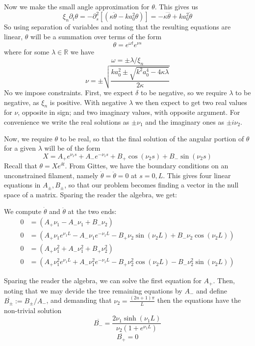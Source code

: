 \documentclass{article}
\theoremstyle{exampstyle} \newtheorem*{remark}{Remark}
\newcommand{\1}{\mathds{1}}
\begin{document}
Now we make the small angle approximation for $\theta$. This gives us
$$\xi_n \partial_t \theta = -\partial_s^2 [(\kappa\ddot{\theta} -ka_0^2\theta)] =-\kappa\ddddot{\theta} +ka_0^2\ddot{\theta}$$
So using separation of variables and noting that the resulting equations are linear, $\theta$ will be a summation over terms of the form 
$$ \theta=e^{\omega t} e^{\nu s} $$
where for some $\lambda \in \mathbb{R}$ we have
$$ \omega=\pm \lambda/\xi_n $$
$$ \nu=\pm \sqrt{ \frac{ ka_0^2 \pm \sqrt{k^2a_0^4-4\kappa\lambda} }{2\kappa} } $$
No we impose constraints. First, we expect $\delta$ to be negative, so we require $\lambda$ to be negative, as $\xi_n$ is positive. With negative $\lambda$ we then expect to get two real values for $\nu$, opposite in sign; and two imaginary values, with opposite argument. For convenience we write the real solutions as $\pm \nu_1$ and the imaginary ones as $\pm i \nu_2 $.

Now, we require $\theta$ to be real, so that the final solution of the angular portion of $\theta$ for a given $\lambda$ will be of the form
$$X=A_+e^{\nu_1 s}+A_-e^{-\nu_1 s}+B_+ \cos(\nu_2 s) +B_-\sin(\nu_2 s) $$
Recall that $\theta = X e^{\delta t}$. From Gittes, we have the boundary conditions on an unconstrained filament, namely $\dot{\theta}=\ddot{\theta}=0$ at $s=0,L$.
This gives four linear equations in $A_{\pm},B_{\pm}$, so that our problem becomes finding a vector in the null space of a matrix. Sparing the reader the algebra, we get:

We compute $\dot\theta$ and $\ddot\theta$ at the two ends:
\begin{align*}
0 &= \left( A_+\nu_1-A_-\nu_1+ B_-\nu_2\right)\\
0 &= \left( A_+\nu_1e^{\nu_1L} -A_-\nu_1e^{-\nu_1L} - B_+\nu_2\sin(\nu_2L) + B_-\nu_2\cos(\nu_2L)\right)\\
0 &= \left( A_+\nu_1^2 + A_-\nu_1^2 + B_+\nu_2^2\right)\\
0 &= \left( A_+\nu_1^2e^{\nu_1L} + A_-\nu_1^2e^{-\nu_1L} - B_+\nu_2^2\cos(\nu_2L) - B_-\nu_2^2\sin(\nu_2L)\right)
\end{align*}


Sparing the reader the algebra, we can solve the first equation for $A_+$. Then, noting that we may devide the tree remaining equations by $A_-$ and define $\overline{B_\pm}:=B_\pm/A_-$, and demanding that $\nu_2=\frac{(2n+1)\pi}{L}$ then the equations have the non-trivial solution
$$ \overline{B_-}=\frac{2\nu_1 \sinh (\nu_1 L)}{\nu_2 (1+e^{\nu_1L})} $$
$$ \overline{B_+}=0 $$
\end{document}

